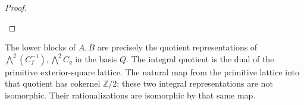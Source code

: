 \begin{proof}
\begin{enumerate}[label={$\langle1\rangle$\arabic*.}]
\end{enumerate}
\end{proof}




\begin{theorem}\hypertarget{tag-02QT}{}\label{night:P1.2}
The lower blocks of $A,B$ are precisely the quotient representations of
$\bigwedge^2(C_f^{-1}),\bigwedge^2C_g$ in the basis $Q$.
The integral quotient is the dual of the primitive exterior-square
lattice.  The natural map from the primitive lattice into that quotient
has cokernel $\mathbb Z/2$; these two integral representations are not
isomorphic.  Their rationalizations are isomorphic by that same map.
\end{theorem}
